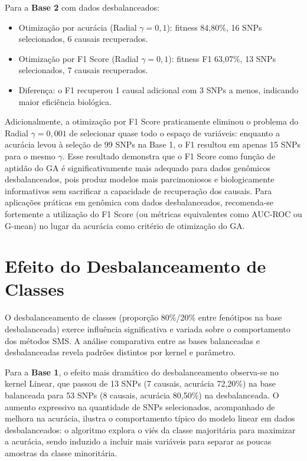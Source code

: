 \documentclass[
    12pt,
    a4paper,
    oneside,
    english,
    french,
    spanish,
    brazil
    ]{abntex2}
\newcommand{\novo}[1]{\textcolor{corNova}{#1}}
\begin{document}
\novo{Para a \textbf{Base 2} com dados desbalanceados:}
\begin{itemize}
  \item \novo{Otimização por acurácia (Radial $\gamma = 0{,}1$): fitness 84,80\%, 16 SNPs selecionados, 6 causais recuperados.}
  \item \novo{Otimização por F1 Score (Radial $\gamma = 0{,}1$): fitness F1 63,07\%, 13 SNPs selecionados, 7 causais recuperados.}
  \item \novo{Diferença: o F1 recuperou 1 causal adicional com 3 SNPs a menos, indicando maior eficiência biológica.}
\end{itemize}

\novo{Adicionalmente, a otimização por F1 Score praticamente eliminou o problema do Radial $\gamma = 0{,}001$ de selecionar quase todo o espaço de variáveis: enquanto a acurácia levou à seleção de 99 SNPs na Base 1, o F1 resultou em apenas 15 SNPs para o mesmo $\gamma$. Esse resultado demonstra que o F1 Score como função de aptidão do GA é significativamente mais adequado para dados genômicos desbalanceados, pois produz modelos mais parcimoniosos e biologicamente informativos sem sacrificar a capacidade de recuperação dos causais. Para aplicações práticas em genômica com dados desbalanceados, recomenda-se fortemente a utilização do F1 Score (ou métricas equivalentes como AUC-ROC ou G-mean) no lugar da acurácia como critério de otimização do GA.}

\chapter{Efeito do Desbalanceamento de Classes}

\novo{O desbalanceamento de classes (proporção 80\%/20\% entre fenótipos na base desbalanceada) exerce influência significativa e variada sobre o comportamento dos métodos SMS. A análise comparativa entre as bases balanceadas e desbalanceadas revela padrões distintos por kernel e parâmetro.}

\novo{Para a \textbf{Base 1}, o efeito mais dramático do desbalanceamento observa-se no kernel Linear, que passou de 13 SNPs (7 causais, acurácia 72,20\%) na base balanceada para 53 SNPs (8 causais, acurácia 80,50\%) na desbalanceada. O aumento expressivo na quantidade de SNPs selecionados, acompanhado de melhora na acurácia, ilustra o comportamento típico do modelo linear em dados desbalanceados: o algoritmo explora o viés da classe majoritária para maximizar a acurácia, sendo induzido a incluir mais variáveis para separar as poucas amostras da classe minoritária.}
\end{document}
